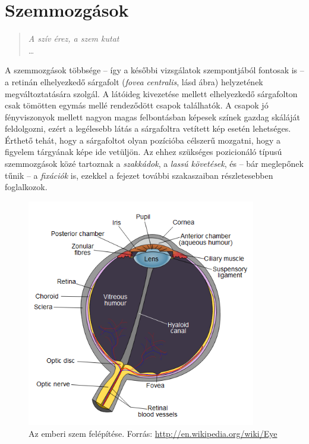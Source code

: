 \chapter{Szemmozgások}\label{sect:osztalyozas}

\begin{verse}
\begin{flushright}
\emph{A szív érez, a szem kutat} \\
\dots
\end{flushright}
\end{verse}

A szemmozgások többsége -- így a későbbi vizsgálatok szempontjából fontosak is -- a retinán elhelyezkedő sárgafolt (\emph{fovea centralis}, lásd  ábra) helyzetének megváltoztatására szolgál. A látóideg kivezetése mellett elhelyezkedő sárgafolton csak tömötten egymás mellé rendeződött csapok találhatók. A csapok jó fényviszonyok mellett nagyon magas felbontásban képesek színek gazdag skáláját feldolgozni, ezért a legélesebb látás a sárgafoltra vetített kép esetén lehetséges. Érthető tehát, hogy a sárgafoltot olyan pozícióba célszerű mozgatni, hogy a figyelem tárgyának képe ide vetüljön. Az ehhez szükséges pozicionáló típusú szemmozgások közé tartoznak a \emph{szakkádok}, a \emph{lassú követések}, és -- bár meglepőnek tűnik -- a \emph{fixációk} is, ezekkel a fejezet további szakaszaiban részletesebben foglalkozok.

\begin{figure}[!ht]
\centering
\includegraphics[width=100mm, keepaspectratio]{figures/eye_diagram.png}
\caption{Az emberi szem felépítése. Forrás: \url{http://en.wikipedia.org/wiki/Eye}}
\label{fig:eyediag}
\end{figure}

